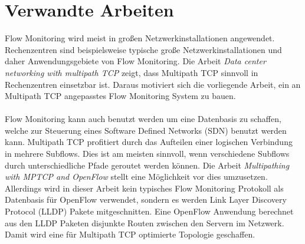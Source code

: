 \documentclass[a4paper, 12pt]{article}
\begin{document}
\section{Verwandte Arbeiten}
Flow Monitoring wird meist in großen Netzwerkinstallationen angewendet.
Rechenzentren sind beispielsweise typische große Netzwerkinstallationen und daher Anwendungsgebiete von Flow Monitoring.
Die Arbeit \textit{Data center networking with multipath TCP} \cite{raiciu2010data} zeigt, dass Multipath TCP
sinnvoll in Rechenzentren einsetzbar ist.
Daraus motiviert sich die vorliegende Arbeit, ein an Multipath TCP angepasstes Flow Monitoring System zu bauen.
\\
\\
Flow Monitoring kann auch benutzt werden um eine Datenbasis zu schaffen, welche zur Steuerung eines Software Defined Networks (SDN) benutzt werden kann.
Multipath TCP profitiert durch das Aufteilen einer logischen Verbindung in mehrere Subflows. Dies ist am meisten sinnvoll, wenn verschiedene Subflows durch unterschiedliche Pfade geroutet werden können. 
Die Arbeit \textit{Multipathing with MPTCP and OpenFlow} \cite{van2012multipathing} stellt eine Möglichkeit vor dies umzusetzen.
Allerdings wird in dieser Arbeit kein typisches Flow Monitoring Protokoll als Datenbasis für OpenFlow verwendet, sondern es werden Link Layer Discovery Protocol (LLDP) Pakete mitgeschnitten. Eine OpenFlow Anwendung berechnet aus den LLDP Paketen disjunkte Routen zwischen den Servern im Netzwerk. Damit wird eine für Multipath TCP optimierte Topologie geschaffen.

\newpage
\end{document}
